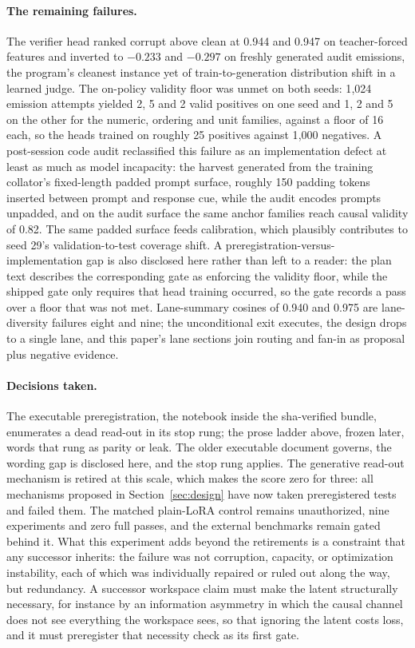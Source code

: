 \documentclass[10pt,a4paper]{article}
\begin{document}
\paragraph{The remaining failures.}
The verifier head ranked corrupt above clean at 0.944 and 0.947 on
teacher-forced features and inverted to $-0.233$ and $-0.297$ on freshly
generated audit emissions, the program's cleanest instance yet of
train-to-generation distribution shift in a learned judge. The on-policy
validity floor was unmet on both seeds: 1{,}024 emission attempts yielded 2,
5 and 2 valid positives on one seed and 1, 2 and 5 on the other for the
numeric, ordering and unit families, against a floor of 16 each, so the heads
trained on roughly 25 positives against 1{,}000 negatives. A post-session
code audit reclassified this failure as an implementation defect at least as
much as model incapacity: the harvest generated from the training collator's
fixed-length padded prompt surface, roughly 150 padding tokens inserted
between prompt and response cue, while the audit encodes prompts unpadded,
and on the audit surface the same anchor families reach causal validity of
0.82. The same padded surface feeds calibration, which plausibly contributes
to seed 29's validation-to-test coverage shift. A
preregistration-versus-implementation gap is also disclosed here rather than
left to a reader: the plan text describes the corresponding gate as enforcing
the validity floor, while the shipped gate only requires that head training
occurred, so the gate records a pass over a floor that was not met. Lane-summary cosines
of 0.940 and 0.975 are lane-diversity failures eight and nine; the
unconditional exit executes, the design drops to a single lane, and this
paper's lane sections join routing and fan-in as proposal plus negative
evidence.

\paragraph{Decisions taken.}
The executable preregistration, the notebook inside the sha-verified bundle,
enumerates a dead read-out in its stop rung; the prose ladder above, frozen
later, words that rung as parity or leak. The older executable document
governs, the wording gap is disclosed here, and the stop rung applies. The
generative read-out mechanism is retired at this scale, which makes the
score zero for three: all mechanisms proposed in Section~\ref{sec:design}
have now taken preregistered tests and failed them. The matched plain-LoRA
control remains unauthorized, nine experiments and zero full passes, and the
external benchmarks remain gated behind it. What this experiment adds beyond the
retirements is a constraint that any successor inherits: the failure was not
corruption, capacity, or optimization instability, each of which was
individually repaired or ruled out along the way, but redundancy. A successor
workspace claim must make the latent structurally necessary, for instance by
an information asymmetry in which the causal channel does not see everything
the workspace sees, so that ignoring the latent costs loss, and it must
preregister that necessity check as its first gate.
\end{document}
